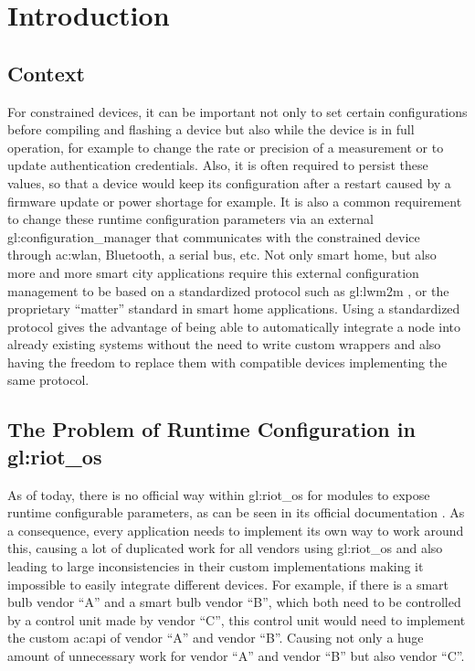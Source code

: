 \chapter{Introduction}
\label{chapter:introduction}

\section{Context}
\label{sec:introduction:context}

For constrained devices, it can be important not only to set certain configurations
before compiling and flashing a device but also while the device is in full operation, for example to change the rate or precision of a measurement or to update authentication credentials.
Also, it is often required to persist these values, so that a device would keep its configuration after a restart caused by a firmware update or power shortage for example.
It is also a common requirement to change these runtime configuration parameters via an external \gls{gl:configuration_manager} that communicates with the constrained device through \acrshort{ac:wlan}, Bluetooth, a serial bus, etc.
Not only smart home, but also more and more smart city applications require this external configuration management to be based on a standardized protocol such as \gls{gl:lwm2m} \cite{oma-lwm2m-core-12}, or the proprietary ``matter'' standard \cite{matter_standard} in smart home applications.
Using a standardized protocol gives the advantage of being able to automatically integrate a node into already existing systems without the need to write custom wrappers and also having the freedom to replace them with compatible devices implementing the same protocol.

\section{The Problem of Runtime Configuration in \gls*{gl:riot_os}}
\label{sec:introduction:problem}

As of today, there is no official way within \gls{gl:riot_os} \cite{bghkl-rosos-18} for modules to expose runtime configurable parameters, as can be seen in its official documentation \cite{riot_documentation}.
As a consequence, every application needs to implement its own way to work around this, causing a lot of duplicated work for all vendors using \gls{gl:riot_os} and also leading to large inconsistencies in their custom implementations making it impossible to easily integrate different devices.
For example, if there is a smart bulb vendor ``A'' and a smart bulb vendor ``B'', which both need to be controlled by a control unit made by vendor ``C'', this control unit would need to implement the custom \gls{ac:api} of vendor ``A'' and vendor ``B''.
Causing not only a huge amount of unnecessary work for vendor ``A'' and vendor ``B'' but also vendor ``C''.

